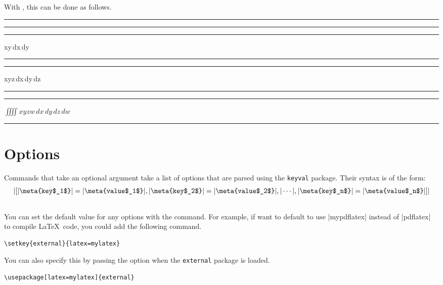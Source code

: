 \documentclass[10pt]{ltxdoc}
\newcommand{\pkg}[1]{\texttt{#1}}
\def\gauge{%
  \rule{0.2em}{7pt}%
  \llap{\rule[8pt]{0.2em}{2pt}}%
}
\begin{document}
With , this can be done as follows.

\begin{tcblisting}{}
\gauge{}\gauge

\gauge\begin{amsenv}
\iint xy\,dx\,dy
\end{amsenv}\gauge

\gauge\begin{amsenv}
\iiint xyz\,dx\,dy\,dz
\end{amsenv}\gauge

\gauge\begin{amsenv}[math=false]
$\iiiint xyzw\,dx\,dy\,dz\,dw$
\end{amsenv}\gauge
\end{tcblisting}

\section{Options}
\label{sec:Options}

Commands that take an optional argument take a list of options that are
parsed using the \pkg{keyval} package.
Their syntax is of the form:
$$
|[|\meta{key$_1$}|=|\meta{value$_1$}|, |\meta{key$_2$}|=|\meta{value$_2$}|, |\cdots|, |\meta{key$_n$}|=|\meta{value$_n$}|]|
$$

\subsection{}
\label{subsec:externalkeys}


You can set the default value for any options with the
 command.
For example, if want to default to use |mypdflatex| instead of
|pdflatex| to compile \LaTeX\ code, you could add the following
command.

\begin{tcolorbox}
\begin{verbatim}
\setkey{external}{latex=mylatex}
\end{verbatim}
\end{tcolorbox}

You can also specify this by passing the option when the \pkg{external}
package is loaded.

\begin{tcolorbox}
\begin{verbatim}
\usepackage[latex=mylatex]{external}
\end{verbatim}
\end{tcolorbox}
\end{document}
